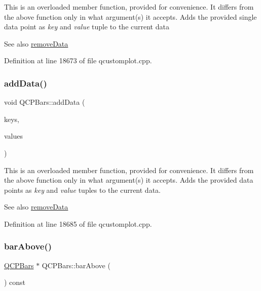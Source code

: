 This is an overloaded member function, provided for convenience. It differs from the above function only in what argument(s) it accepts. Adds the provided single data point as {\itshape key} and {\itshape value} tuple to the current data \begin{DoxySeeAlso}{See also}
\hyperlink{class_q_c_p_bars_a1fe9bcb57d670defea1bb65cadf43765}{remove\+Data} 
\end{DoxySeeAlso}


Definition at line 18673 of file qcustomplot.\+cpp.

\mbox{\label{class_q_c_p_bars_a3679a0a9decab0fa03f8f4c6e3344d52}} 
\subsubsection{\texorpdfstring{add\+Data()}{addData()}\hspace{0.1cm}{\footnotesize\ttfamily [4/4]}}
{\footnotesize\ttfamily void Q\+C\+P\+Bars\+::add\+Data (\begin{DoxyParamCaption}\item[{const Q\+Vector$<$ double $>$ \&}]{keys,  }\item[{const Q\+Vector$<$ double $>$ \&}]{values }\end{DoxyParamCaption})}

This is an overloaded member function, provided for convenience. It differs from the above function only in what argument(s) it accepts. Adds the provided data points as {\itshape key} and {\itshape value} tuples to the current data. \begin{DoxySeeAlso}{See also}
\hyperlink{class_q_c_p_bars_a1fe9bcb57d670defea1bb65cadf43765}{remove\+Data} 
\end{DoxySeeAlso}


Definition at line 18685 of file qcustomplot.\+cpp.

\mbox{\label{class_q_c_p_bars_ab97f2acd9f6cb40d2cc3c33d278f0e78}} 
\subsubsection{\texorpdfstring{bar\+Above()}{barAbove()}}
{\footnotesize\ttfamily \hyperlink{class_q_c_p_bars}{Q\+C\+P\+Bars} $\ast$ Q\+C\+P\+Bars\+::bar\+Above (\begin{DoxyParamCaption}{ }\end{DoxyParamCaption}) const\hspace{0.3cm}{\ttfamily [inline]}}

